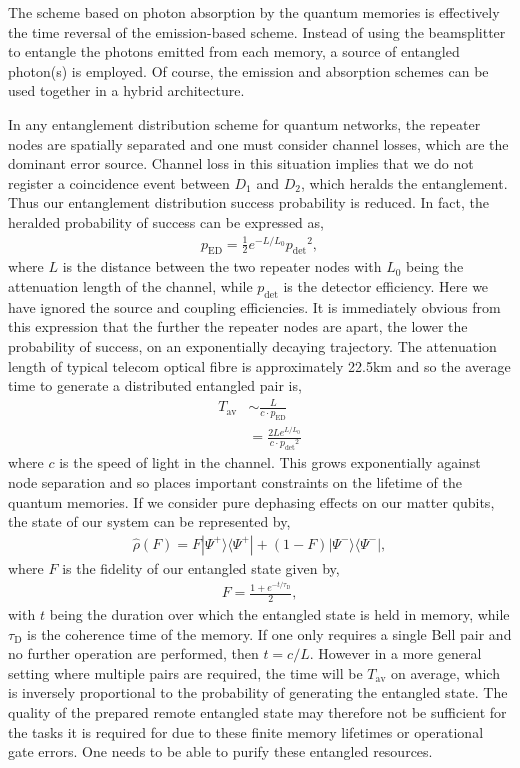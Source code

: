 The scheme based on photon absorption by the quantum memories is effectively the time reversal of the emission-based scheme. Instead of using the beamsplitter to entangle the photons emitted from each memory, a source of entangled photon(s) is employed. Of course, the emission and absorption schemes can be used together in a hybrid architecture.

In any entanglement distribution scheme for quantum networks, the repeater nodes are spatially separated and one must consider channel losses, which are the dominant error source. Channel loss in this situation implies that we do not register a coincidence event between $D_1$ and $D_2$, which heralds the entanglement. Thus our entanglement distribution success probability is reduced. In fact, the heralded probability of success can be expressed as,
\begin{align}
p_\mathrm{ED}= \frac{1}{2} e^{-L/L_0} {p_\mathrm{det}}^2,
\end{align} 
where $L$ is the distance between the two repeater nodes with $L_0$ being the attenuation length of the channel, while $p_\mathrm{det}$ is the detector efficiency. Here we have ignored the source and coupling efficiencies. It is immediately obvious from this expression that the further the repeater nodes are apart, the lower the probability of success, on an exponentially decaying trajectory. The attenuation length of typical telecom optical fibre is approximately 22.5km and so the average time to generate a distributed entangled pair is,
\begin{align}
T_\mathrm{av} &\sim \frac{L}{ c \cdot p_\mathrm{ED}}\nonumber\\
&= \frac{2 L e^{L/L_0}}{ c \cdot {p_\mathrm{det}}^2}
\end{align} 
where $c$ is the speed of light in the channel. This grows exponentially against node separation and so places important constraints on the lifetime of the quantum memories. If we consider pure dephasing effects on our matter qubits, the state of our system can be represented by,
\begin{align}
\hat\rho(F) = F |\Psi^+\rangle \langle \Psi^+|+(1-F) |\Psi^-\rangle \langle \Psi^-|,
\label{eq:rho_bell_fid}
\end{align} 
where $F$ is the fidelity of our entangled state given by,
\begin{align}
F=\frac{1+e^{-t/\tau_\mathrm{D}}}{2},
\end{align} 
with $t$ being the duration over which the entangled state is held in memory, while $\tau_\mathrm{D}$ is the coherence time of the memory. If one only requires a single Bell pair and no further operation are performed, then \mbox{$t=c/L$}. However in a more general setting where multiple pairs are required, the time will be $T_\mathrm{av}$ on average, which is inversely proportional to the probability of generating the entangled state. The quality of the prepared remote entangled state may therefore not be sufficient for the tasks it is required for due to these finite memory lifetimes or operational gate errors. One needs to be able to purify these entangled resources. 

